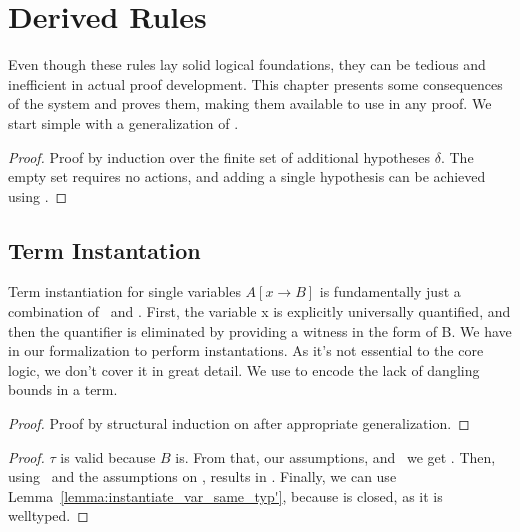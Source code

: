 \chapter{Derived Rules}\label{chapter:derived}

Even though these rules lay solid logical foundations, they can be tedious and inefficient in actual proof development.
This chapter presents some consequences of the system and proves them, making them available to use in any proof.
We start simple with a generalization of \wk.

\begin{theorem}
\end{theorem}
\begin{proof}
    Proof by induction over the finite set of additional hypotheses \(\delta\).
    The empty set requires no actions, and adding a single hypothesis can be achieved using \wk.
\end{proof}

\section{Term Instantation}
Term instantiation for single variables \(A[x \rightarrow B]\) is fundamentally just a combination of \aIv\ and \aE.
First, the variable x is explicitly universally quantified, and then the quantifier is eliminated by providing a witness in the form of B.
We have  in our formalization to perform instantations.
As it's not essential to the core logic, we don't cover it in great detail.
We use  to encode the lack of dangling bounds in a term.

\begin{lemma}
\end{lemma}
\begin{proof}
    Proof by structural induction on  after appropriate generalization.
\end{proof}

\begin{theorem}
\end{theorem}
\begin{proof}
    \(\tau\) is valid because \(B\) is. From that, our assumptions, and \aIv\ we get . Then, using \aE\ and the assumptions on , results in . Finally, we can use Lemma~\ref{lemma:instantiate_var_same_typ'}, because  is closed, as it is welltyped.
\end{proof}

